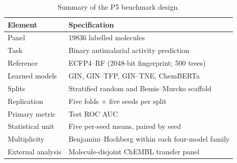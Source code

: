 \begin{table}[ht!]
\centering
\caption{Summary of the P5 benchmark design.}
\label{tab:study_design}
\begin{tabular}{ll}
\toprule
Element & Specification \\
\midrule
Panel & \num{19836} labelled molecules \\
Task & Binary antimalarial activity prediction \\
Reference & ECFP4--RF (\num{2048}-bit fingerprint; \num{500} trees) \\
Learned models & GIN, GIN--TFP, GIN--TNE, ChemBERTa \\
Splits & Stratified random and Bemis--Murcko scaffold \\
Replication & Five folds $\times$ five seeds per split \\
Primary metric & Test ROC AUC \\
Statistical unit & Five per-seed means, paired by seed \\
Multiplicity & Benjamini--Hochberg within each four-model family \\
External analysis & Molecule-disjoint ChEMBL transfer panel \\
\bottomrule
\end{tabular}
\end{table}
